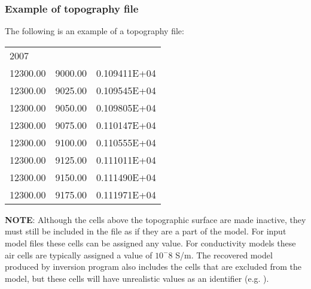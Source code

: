 \subsubsection*{Example of topography file}
The following is an example of a topography file:
\begin{fileExample}
\begin{tabular}{|lcc|}
\hline
2007 & & \\
12300.00 & 9000.00 & 0.109411E+04 \\
12300.00 & 9025.00 & 0.109545E+04 \\
12300.00 & 9050.00 & 0.109805E+04 \\
12300.00 & 9075.00 & 0.110147E+04 \\
12300.00 & 9100.00 & 0.110555E+04 \\
12300.00 & 9125.00 & 0.111011E+04 \\
12300.00 & 9150.00 & 0.111490E+04 \\
12300.00 & 9175.00 & 0.111971E+04 \\
\hline
\end{tabular}
\end{fileExample}
%
\textbf{NOTE}: Although the cells above the topographic surface are made inactive, they must still be included in the  file as if they are a part of the model. For input model files these cells can be assigned any value. For conductivity models these air cells are typically assigned a value of $10^-8$ S/m. The recovered model produced by inversion program also includes the cells that are excluded from the model, but these cells will have unrealistic values as an identifier (e.g. ).